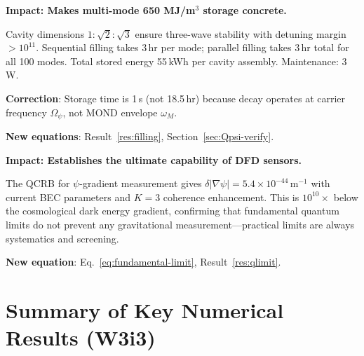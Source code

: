 \documentclass[11pt]{article}
\theoremstyle{definition}
\theoremstyle{remark}
\newcommand{\Opsi}{\Omega_\psi}
\begin{document}
\begin{tcolorbox}[colback=yellow!5!white,colframe=orange!75!black,title=
{Discovery \#4: 100-Mode Filling Protocol with Irrational Cavity Ratios}]
\textbf{Impact: Makes multi-mode 650 MJ/m$^3$ storage concrete.}

Cavity dimensions $1:\sqrt{2}:\sqrt{3}$ ensure three-wave stability
with detuning margin $> 10^{11}$. Sequential filling takes 3\,hr per
mode; parallel filling takes 3\,hr total for all 100 modes. Total
stored energy 55\,kWh per cavity assembly. Maintenance: 3\,W.

\textbf{Correction}: Storage time is 1\,s (not 18.5\,hr) because
decay operates at carrier frequency $\Opsi$, not MOND envelope
$\omega_M$.

\textbf{New equations}: Result~\ref{res:filling}, Section~\ref{sec:Qpsi-verify}.
\end{tcolorbox}

\begin{tcolorbox}[colback=purple!5!white,colframe=purple!75!black,title=
{Discovery \#5: Fundamental Quantum Limit on $\psi$-Gradient is
$5.4 \times 10^{-44}$\,m$^{-1}$}]
\textbf{Impact: Establishes the ultimate capability of DFD sensors.}

The QCRB for $\psi$-gradient measurement gives
$\delta|\nabla\psi| = 5.4 \times 10^{-44}$\,m$^{-1}$ with current
BEC parameters and $K=3$ coherence enhancement. This is $10^{10}\times$
below the cosmological dark energy gradient, confirming that
fundamental quantum limits do not prevent any gravitational
measurement---practical limits are always systematics and screening.

\textbf{New equation}: Eq.~\eqref{eq:fundamental-limit},
Result~\ref{res:qlimit}.
\end{tcolorbox}

\section*{Summary of Key Numerical Results (W3i3)}
\end{document}
